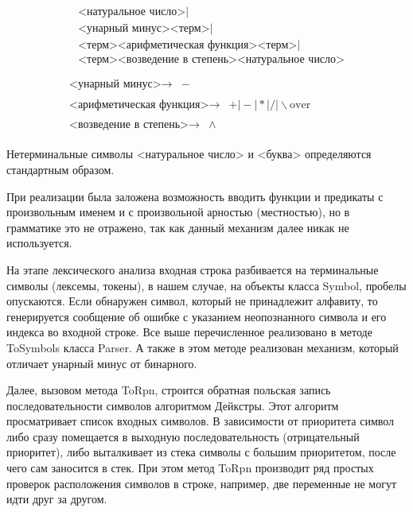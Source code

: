 \begin{equation*}
\begin{array}{l}
\begin{array}{ll}
            & \text{<натуральное число>} \textbf{|} \\
            & \text{<унарный минус>}\text{<терм>} \textbf{|} \\
            & \text{<терм>}\text{<арифметическая функция>}\text{<терм>} \textbf{|} \\
            & \text{<терм>}\text{<возведение в степень>}\text{<натуральное число>}\\
        \end{array} 
        \\
        \begin{array}{ll}
            \text{<унарный минус>}\rightarrow & -
        \end{array} \\ 
        \begin{array}{ll}
            \text{<арифметическая функция>}\rightarrow & + \textbf{|} - \textbf{|} * \textbf{|} / \textbf{|} \backslash \text{over}
        \end{array} \\ 
        \begin{array}{ll}
            \text{<возведение в степень>}\rightarrow & \wedge
        \end{array}
    \end{array}       
\end{equation*}

    Нетерминальные символы <натуральное число> и <буква> определяются стандартным образом.

    При реализации была заложена возможность вводить функции и предикаты с произвольным именем и с произвольной арностью (местностью), но в грамматике это не отражено, так как данный механизм далее никак не используется.

На этапе лексического анализа входная строка разбивается на терминальные символы (лексемы, токены), в нашем случае, на объекты класса Symbol, пробелы опускаются. Если обнаружен символ, который не принадлежит алфавиту, то генерируется сообщение об ошибке с указанием неопознанного символа и его индекса во входной строке. Все выше перечисленное реализовано в методе ToSymbols класса Parser. А также в этом методе реализован механизм, который отличает унарный минус от бинарного.

Далее, вызовом метода ToRpn, строится обратная польская запись последовательности символов алгоритмом Дейкстры. Этот алгоритм просматривает список входных символов. В зависимости от приоритета символ либо сразу помещается в выходную последовательность (отрицательный приоритет), либо выталкивает из стека символы с большим приоритетом, после чего сам заносится в стек. При этом метод ToRpn производит ряд простых проверок расположения символов в строке, например, две переменные не могут идти друг за другом.


